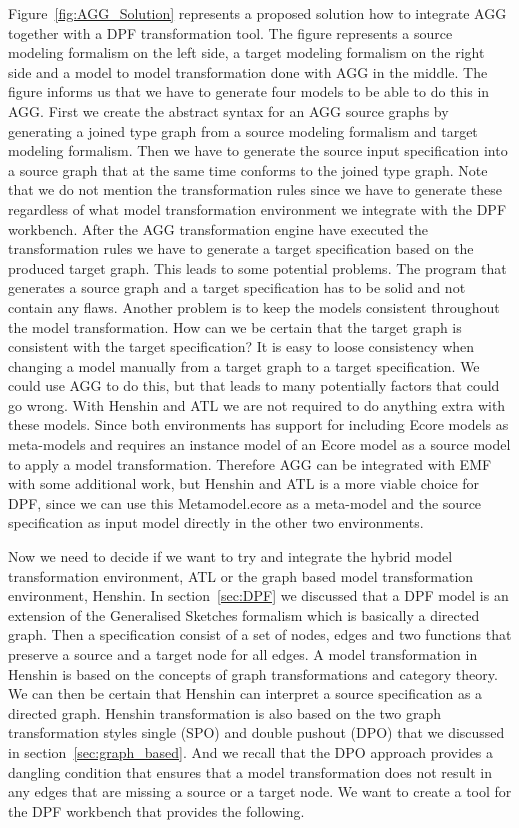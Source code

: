 Figure~\ref{fig:AGG_Solution} represents a proposed solution how to integrate
AGG together with a DPF transformation tool. The figure represents a source
modeling formalism on the left side, a target modeling formalism on the right
side and a model to model transformation done with AGG in the middle. The
figure informs us that we have to generate four models to be able to do this in
AGG. First we create the abstract syntax for an AGG source graphs by generating
a joined type graph from a source modeling formalism and target modeling
formalism. Then we have to generate the source input specification into a source
graph that at the same time conforms to the joined type graph. Note that we do
not mention the transformation rules since we have to generate these regardless
of what model transformation environment we integrate with the DPF workbench.
After the AGG transformation engine have executed the transformation rules we
have to generate a target specification based on the produced target graph. This
leads to some potential problems. The program that generates a source graph and
a target specification has to be solid and not contain any flaws. Another
problem is to keep the models consistent throughout the model transformation.
How can we be certain that the target graph is consistent with the target
specification? It is easy to loose consistency when changing a model manually
from a target graph to a target specification. We could use AGG to do this, but
that leads to many potentially factors that could go wrong. With Henshin and
ATL we are not required to do anything extra with these models. Since both
environments has support for including Ecore models as meta-models and requires
an instance model of an Ecore model as a source model to apply a model
transformation. Therefore AGG can be integrated with EMF with some additional
work, but Henshin and ATL is a more viable choice for DPF, since we can use
this Metamodel.ecore as a meta-model and the source specification as input
model directly in the other two environments. 

Now we need to decide if we want to try and integrate the hybrid model
transformation environment, ATL or the graph based model transformation
environment, Henshin. In section~\ref{sec:DPF} we discussed that a DPF model is
an extension of the Generalised Sketches formalism which is basically a directed
graph. Then a specification consist of a set of nodes, edges and two functions
that preserve a source and a target node for all edges. A model transformation
in Henshin is based on the concepts of graph transformations and category
theory. We can then be certain that Henshin can interpret a source specification
as a directed graph. Henshin transformation is also based on the two graph
transformation styles single (SPO) and double pushout (DPO) that we discussed in
section~\ref{sec:graph_based}. And we recall that the DPO approach provides a
dangling condition that ensures that a model transformation does not result in
any edges that are missing a source or a target node. We want to create a tool
for the DPF workbench that provides the following. 

